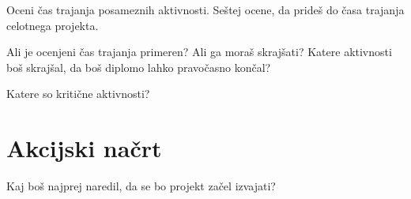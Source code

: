 \documentclass[11pt,a4paper]{article}
\begin{document}
Oceni čas trajanja posameznih aktivnosti.
Seštej ocene, da prideš do časa trajanja celotnega projekta.

Ali je ocenjeni čas trajanja primeren? Ali ga moraš skrajšati? Katere aktivnosti boš skrajšal, da boš diplomo lahko pravočasno končal?

Katere so kritične aktivnosti?


\section{Akcijski načrt}

Kaj boš najprej naredil, da se bo projekt začel izvajati?
\end{document}
